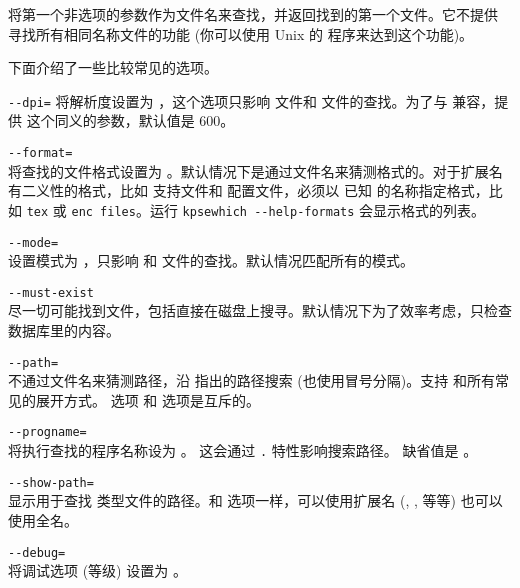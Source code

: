 \documentclass{article}
\begin{document}
\KPS{} 将第一个非选项的参数作为文件名来查找，并返回找到的第一个文件。它不提供
寻找所有相同名称文件的功能 (你可以使用 Unix 的  程序来达到这个功能)。

下面介绍了一些比较常见的选项。

\begin{ttdescription}
  \item[\texttt{-{}-dpi=\var{num}}]\mbox{}
  将解析度设置为 ，这个选项只影响  文件和 
  文件的查找。为了与  兼容，提供 
  这个同义的参数，默认值是 600。

  \item[\texttt{-{}-format=\var{name}}]\mbox{}\\
  将查找的文件格式设置为 。默认情况下是通过文件名来猜测格式的。对于扩展名
  有二义性的格式，比如 \MP{} 支持文件和  配置文件，必须以 \KPS{} 已知
  的名称指定格式，比如 \texttt{tex} 或 \texttt{enc files}。运行
  \texttt{kpsewhich -{}-help-formats} 会显示格式的列表。

  \item[\texttt{-{}-mode=\var{string}}]\mbox{}\\
  设置模式为 ，只影响  和 
  文件的查找。默认情况匹配所有的模式。
  \item[\texttt{-{}-must-exist}]\mbox{}\\
  尽一切可能找到文件，包括直接在磁盘上搜寻。默认情况下为了效率考虑，只检查
   数据库里的内容。
  \item[\texttt{-{}-path=\var{string}}]\mbox{}\\
  不通过文件名来猜测路径，沿  指出的路径搜索
  (也使用冒号分隔)。支持 \samp{//} 和所有常见的展开方式。 选项
  和  选项是互斥的。
  \item[\texttt{-{}-progname=\var{name}}]\mbox{}\\
  将执行查找的程序名称设为 \texttt{}。
  这会通过 \texttt{.} 特性影响搜索路径。
  缺省值是 。
  \item[\texttt{-{}-show-path=\var{name}}]\mbox{}\\
  显示用于查找 \texttt{} 类型文件的路径。和 
  选项一样，可以使用扩展名 (, , 等等) 也可以使用全名。
  \item[\texttt{-{}-debug=\var{num}}]\mbox{}\\
  将调试选项 (等级) 设置为 \texttt{}。
\end{ttdescription}
\end{document}
